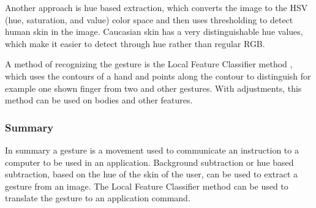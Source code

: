 Another approach is hue based extraction, which converts the image to the HSV (hue, saturation, and value) color space and then uses thresholding to detect human skin in the image. Caucasian skin has a very distinguishable hue values, which make it easier to detect through hue rather than regular RGB. \parencite{Busaryev}
\bigskip

A method of recognizing the gesture is the Local Feature Classifier method \parencite{Busaryev}, which uses the contours of a hand and points along the contour to distinguish for example one shown finger from two and other gestures. With adjustments, this method can be used on bodies and other features.

\subsubsection*{Summary}
In summary a gesture is a movement used to communicate an instruction to a computer to be used in an application. Background subtraction or hue based subtraction, based on the hue of the skin of the user, can be used to extract a gesture from an image. The Local Feature Classifier method can be used to translate the gesture to an application command.